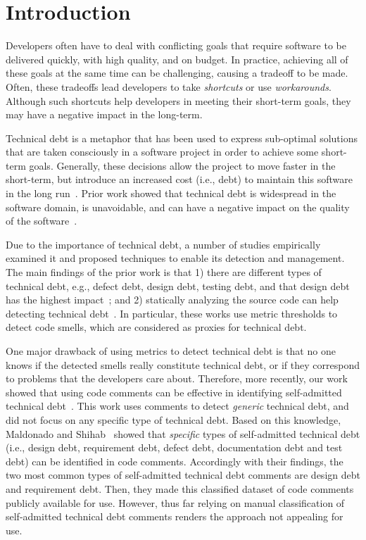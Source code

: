 \documentclass{sig-alternate}
\newcommand{\SATD}{self-admitted technical debt\xspace}
\begin{document}
\terms{}

\keywords{}

\section{Introduction}
\label{sec:introduction}
Developers often have to deal with conflicting goals that require software to be delivered quickly, with high quality, and on budget. In practice, achieving all of these goals at the same time can be challenging, causing a tradeoff to be made. Often, these tradeoffs lead developers to take \emph{shortcuts} or use \emph{workarounds}. Although such shortcuts help developers in meeting their short-term goals, they may have a negative impact in the long-term.

Technical debt is a metaphor that has been used to express sub-optimal solutions that are taken consciously in a software project in order to achieve some short-term goals. Generally, these decisions allow the project to move faster in the short-term, but introduce an increased cost (i.e., debt) to maintain this software in the long run~\cite{Seaman2011,Kruchten2013IWMTD}. Prior work showed that technical debt is widespread in the software domain, is unavoidable, and can have a negative impact on the quality of the software~\cite{Lim2012Software}.

Due to the importance of technical debt, a number of studies empirically examined it and proposed techniques to enable its detection and management. The main findings of the prior work is that 1) there are different types of technical debt, e.g., defect debt, design debt, testing debt, and that design debt has the highest impact~\cite{Alves2014MTD,Marinescu2012IBM}; and 2) statically analyzing the source code can help detecting technical debt~\cite{Marinescu2004ICSM,Marinescu2010CSMR,Zazworka2013CSE}. In particular, these works use metric thresholds to detect code smells, which are considered as proxies for technical debt. 

One major drawback of using metrics to detect technical debt is that no one knows if the detected smells really constitute technical debt, or if they correspond to problems that the developers care about. Therefore, more recently, our work showed that using code comments can be effective in identifying self-admitted technical debt~\cite{Potdar2014ICSME}. This work uses comments to detect \emph{generic} technical debt, and did not focus on any specific type of technical debt. Based on this knowledge, Maldonado and Shihab~\cite{Maldonado2015MTD} showed that \emph{specific} types of self-admitted technical debt (i.e., design debt, requirement debt, defect debt, documentation debt and test debt) can be identified in code comments. Accordingly with their findings, the two most common types of \SATD comments are design debt and requirement debt. Then, they made this classified dataset of code comments publicly available for use. However, thus far relying on manual classification of \SATD comments renders the approach not appealing for use.
\end{document}
